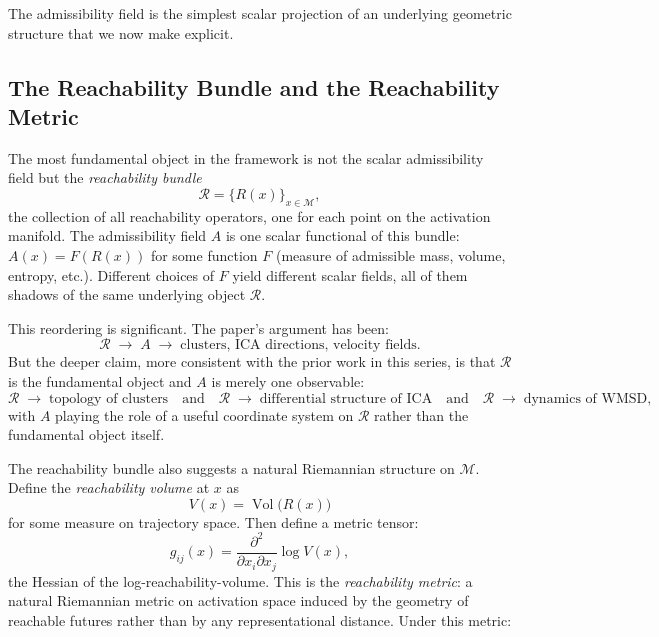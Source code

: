 \documentclass[12pt, a4paper]{article}
\theoremstyle{plain}
\theoremstyle{definition}
\theoremstyle{remark}
\newcommand{\cM}{\mathcal{M}}
\newcommand{\fA}{A}
\newcommand{\lra}{\longrightarrow}
\begin{document}
The admissibility field is the simplest scalar projection of an underlying
geometric structure that we now make explicit.

\subsection{The Reachability Bundle and the Reachability Metric}

The most fundamental object in the framework is not the scalar admissibility
field but the \emph{reachability bundle}
\begin{equation}
  \mathcal{R} = \bigl\{R(x)\bigr\}_{x \in \cM},
\end{equation}
the collection of all reachability operators, one for each point on the
activation manifold. The admissibility field $\fA$ is one scalar functional
of this bundle: $\fA(x) = F(R(x))$ for some function $F$ (measure of admissible
mass, volume, entropy, etc.). Different choices of $F$ yield different scalar
fields, all of them shadows of the same underlying object $\mathcal{R}$.

This reordering is significant. The paper's argument has been:
\begin{equation}
  \mathcal{R} \;\lra\; \fA \;\lra\; \text{clusters, ICA directions, velocity fields}.
\end{equation}
But the deeper claim, more consistent with the prior work in this series, is
that $\mathcal{R}$ is the fundamental object and $\fA$ is merely one observable:
\begin{equation}
  \mathcal{R} \;\lra\; \text{topology of clusters}
  \quad\text{and}\quad
  \mathcal{R} \;\lra\; \text{differential structure of ICA}
  \quad\text{and}\quad
  \mathcal{R} \;\lra\; \text{dynamics of WMSD},
\end{equation}
with $\fA$ playing the role of a useful coordinate system on $\mathcal{R}$
rather than the fundamental object itself.

The reachability bundle also suggests a natural Riemannian structure on $\cM$.
Define the \emph{reachability volume} at $x$ as
\begin{equation}
  V(x) = \operatorname{Vol}\bigl(R(x)\bigr)
\end{equation}
for some measure on trajectory space. Then define a metric tensor:
\begin{equation}
  g_{ij}(x) = \frac{\partial^2}{\partial x_i \partial x_j}
  \log V(x),
  \label{eq:reachability_metric}
\end{equation}
the Hessian of the log-reachability-volume. This is the \emph{reachability
metric}: a natural Riemannian metric on activation space induced by the
geometry of reachable futures rather than by any representational distance.
Under this metric:
\end{document}
